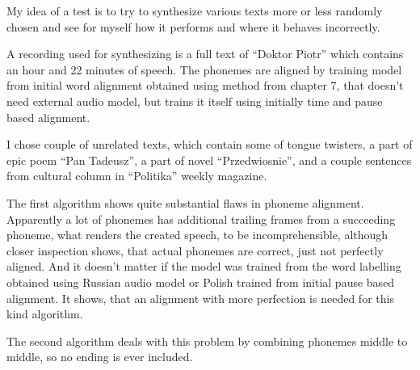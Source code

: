 \documentclass[12pt,a4paper,english]{article}
\begin{document}
My idea of a test is to try to synthesize various texts more or less randomly chosen and see for myself how it performs and where it behaves incorrectly. \newline

A recording used for synthesizing is a full text of “Doktor Piotr” which contains an hour and 22 minutes of speech. The phonemes are aligned by training model from initial word alignment obtained using method from chapter 7, that doesn't need external audio model, but trains it itself using initially time and pause based alignment. \newline

I chose couple of unrelated texts, which contain some of tongue twisters, a part of epic poem “Pan Tadeusz”, a part of novel “Przedwiosnie”, and a couple sentences from cultural column in “Politika” weekly magazine. \newline
\newline

The first algorithm shows quite substantial flaws in phoneme alignment. Apparently a lot of phonemes has additional trailing frames from a succeeding phoneme, what renders the created speech, to be incomprehensible, although closer inspection shows, that actual phonemes are correct, just not perfectly aligned. And it doesn't matter if the model was trained from the word labelling obtained using Russian audio model or Polish trained from initial pause based alignment. It shows, that an alignment with more perfection is needed for this kind algorithm. \newline

The second algorithm deals with this problem by combining phonemes middle to middle, so no ending is ever included. 
\end{document}
